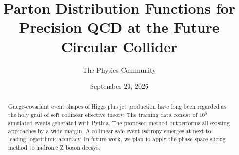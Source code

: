 \documentclass[11pt]{article}
\title{Parton Distribution Functions for Precision QCD at the Future Circular Collider}
\author{The Physics Community}
\date{September 20, 2026}
\numberwithin{equation}{section}
\theoremstyle{definition}
\theoremstyle{remark}
\begin{document}
\maketitle
\begin{abstract}
Gauge-covariant event shapes of Higgs plus jet production have long been
regarded as the holy grail of soft-collinear effective theory. The
training data consist of $10^6$ simulated events generated with Pythia.
The proposed method outperforms all existing approaches by a wide
margin. A collinear-safe event isotropy emerges at next-to-leading
logarithmic accuracy. In future work, we plan to apply the phase-space
slicing method to hadronic Z boson decays.
\end{abstract}
\tableofcontents





\nocite{*}


\end{document}
